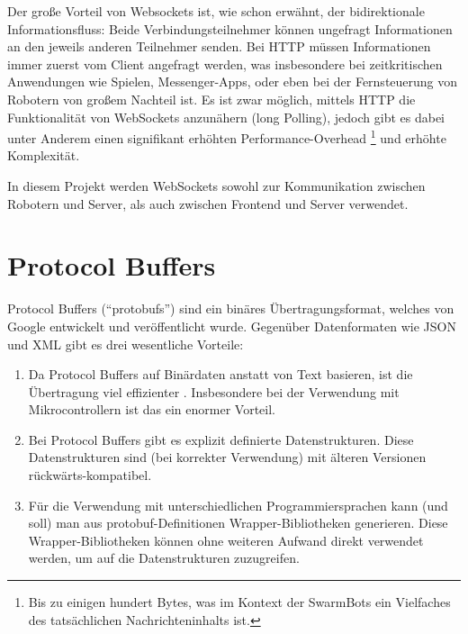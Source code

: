 Der große Vorteil von Websockets ist,
wie schon erwähnt,
der bidirektionale Informationsfluss:
%
Beide Verbindungsteilnehmer können ungefragt Informationen an den jeweils anderen Teilnehmer senden.
%
Bei HTTP müssen Informationen immer zuerst vom Client angefragt werden,
was insbesondere bei zeitkritischen Anwendungen wie Spielen,
Messenger-Apps,
oder eben bei der Fernsteuerung von Robotern von großem Nachteil ist.
%
Es ist zwar möglich,
mittels HTTP die Funktionalität von WebSockets anzunähern (long Polling),
jedoch gibt es dabei unter Anderem \cite{rfc6202} einen signifikant erhöhten Performance-Overhead%
\footnote{Bis zu einigen hundert Bytes,
  was im Kontext der SwarmBots ein Vielfaches des tatsächlichen Nachrichteninhalts ist.}
und erhöhte Komplexität.

In diesem Projekt werden WebSockets sowohl zur Kommunikation zwischen Robotern und Server,
als auch zwischen Frontend und Server verwendet.

\section{Protocol Buffers}
\label{subsec:ueberblick_protobufs}
Protocol Buffers \cite{protobufs} (``protobufs'') sind ein binäres Übertragungsformat,
welches von Google entwickelt und veröffentlicht wurde.
%
Gegenüber Datenformaten wie JSON und XML gibt es drei wesentliche Vorteile:
\begin{enumerate}
    \item Da Protocol Buffers auf Binärdaten anstatt von Text basieren,
    ist die Übertragung viel effizienter \cite{7765670}.
    Insbesondere bei der Verwendung mit Mikrocontrollern ist das ein enormer Vorteil.

    \item Bei Protocol Buffers gibt es explizit definierte Datenstrukturen.
    Diese Datenstrukturen sind (bei korrekter Verwendung) mit älteren Versionen rückwärts-kompatibel.

    \item Für die Verwendung mit unterschiedlichen Programmiersprachen kann (und soll) man aus protobuf-Definitionen
    Wrapper-Bibliotheken generieren.
    Diese Wrapper-Bibliotheken können ohne weiteren Aufwand direkt verwendet werden,
    um auf die Datenstrukturen zuzugreifen.
\end{enumerate}


